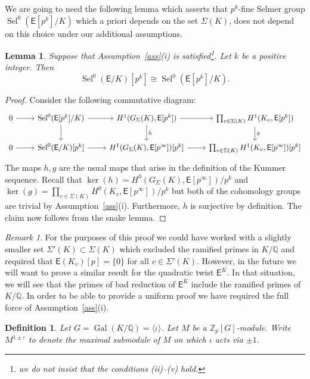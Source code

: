 \documentclass{amsart}
\newtheorem{lemma}[theorem]{Lemma}
\newtheorem{definition}[theorem]{Definition}
\numberwithin{equation}{section}
\theoremstyle{remark}
\newtheorem{remark}[theorem]{Remark}
\newcommand{\Gal}{\operatorname{Gal}}
\newcommand{\Sel}{\operatorname{Sel}}
\newcommand{\Z}{\mathbb{Z}}
\newcommand{\Q}{\mathbb{Q}}
\newcommand{\EC}{\mathsf{E}}
\theoremstyle{plain} %
\begin{document}
We are going to need the following lemma which asserts that $p^k$-fine Selmer group $\Sel^0(\EC[p^k]/K)$ which a priori depends on the set $\Sigma(K)$, does not depend on this choice under our additional assumptions.

\begin{lemma}
\label{isom:different-selmer}
Suppose that Assumption~\ref{ass}\textup{(}i\textup{)} is satisfied\footnote{we do not insist that the conditions (ii)--{(v)} hold.}.
Let $k$ be a positive integer.
Then
\[
\Sel^0(\EC/K)[p^k]\cong \Sel^0(\EC[p^k]/K).
\]
\end{lemma}

\begin{proof}
Consider the following commutative diagram:
\[
\begin{tikzcd}
        0\arrow[r] &\Sel^0(\EC[p^k]/K) \arrow[r]\arrow[d]&H^1(G_\Sigma(K),\EC[p^k])\arrow[r]\arrow[d,"h"]& \prod_{v\in \Sigma(K)}H^1(K_{v},\EC[p^k])\arrow[d,"g"]\\
        0\arrow[r] &\Sel^0(\EC/K)[p^k] \arrow[r]&H^1(G_\Sigma(K),\EC[p^\infty])[p^k]\arrow[r]& \prod_{v\in \Sigma(K)}H^1(K_{v},\EC[p^\infty])[p^k]
\end{tikzcd}
\]
The maps $h,g$ are the usual maps that arise in the definition of the Kummer sequence.
Recall that $\ker(h) = H^0(G_\Sigma(K),\EC[p^\infty])/p^k$ and $\ker(g)=\prod_{v\in \Sigma(K)}H^0(K_v,\EC[p^\infty])/p^k$ but both of the cohomology groups are trivial by Assumption~\ref{ass}(i).
Furthermore, $h$ is surjective by definition.
The claim now follows from the snake lemma.
\end{proof}

\begin{remark}
For the purposes of this proof we could have worked with a slightly smaller set $\Sigma'(K) \subset \Sigma(K)$ which excluded the ramified primes in $K/\Q$ and required that $\EC(K_v)[p]=\{0\}$ for all $v\in \Sigma'(K)$.
However, in the future we will want to prove a similar result for the quadratic twist $\EC^K$.
In that situation, we will see that the primes of bad reduction of $\EC^K$ include the ramified primes of $K/\Q$.
In order to be able to provide a uniform proof we have required the full force of Assumption~\ref{ass}(i).
\end{remark}

\begin{definition}
Let $G=\Gal(K/\Q)=\langle \iota \rangle$.
Let $M$ be a $\Z_p[G]$-module.
Write $M^{1\pm \iota}$ to denote the maximal submodule of $M$ on which $\iota$ acts via $\pm 1$.
\end{definition}
\end{document}
